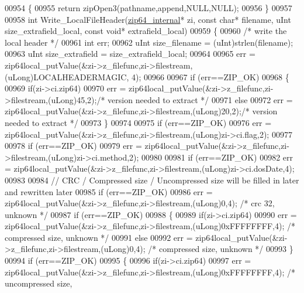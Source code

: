 \begin{DoxyCode}
00954 \{
00955     \textcolor{keywordflow}{return} zipOpen3(pathname,append,NULL,NULL);
00956 \}
00957 
00958 \textcolor{keywordtype}{int} Write\_LocalFileHeader(\hyperlink{structzip64__internal}{zip64\_internal}* zi, \textcolor{keyword}{const} \textcolor{keywordtype}{char}* filename, uInt 
      size\_extrafield\_local, \textcolor{keyword}{const} \textcolor{keywordtype}{void}* extrafield\_local)
00959 \{
00960   \textcolor{comment}{/* write the local header */}
00961   \textcolor{keywordtype}{int} err;
00962   uInt size\_filename = (uInt)strlen(filename);
00963   uInt size\_extrafield = size\_extrafield\_local;
00964 
00965   err = zip64local\_putValue(&zi->z\_filefunc,zi->filestream,(uLong)LOCALHEADERMAGIC, 4);
00966 
00967   \textcolor{keywordflow}{if} (err==ZIP\_OK)
00968   \{
00969     \textcolor{keywordflow}{if}(zi->ci.zip64)
00970       err = zip64local\_putValue(&zi->z\_filefunc,zi->filestream,(uLong)45,2);\textcolor{comment}{/* version needed to extract */}
00971     \textcolor{keywordflow}{else}
00972       err = zip64local\_putValue(&zi->z\_filefunc,zi->filestream,(uLong)20,2);\textcolor{comment}{/* version needed to extract */}
00973   \}
00974 
00975   \textcolor{keywordflow}{if} (err==ZIP\_OK)
00976     err = zip64local\_putValue(&zi->z\_filefunc,zi->filestream,(uLong)zi->ci.flag,2);
00977 
00978   \textcolor{keywordflow}{if} (err==ZIP\_OK)
00979     err = zip64local\_putValue(&zi->z\_filefunc,zi->filestream,(uLong)zi->ci.method,2);
00980 
00981   \textcolor{keywordflow}{if} (err==ZIP\_OK)
00982     err = zip64local\_putValue(&zi->z\_filefunc,zi->filestream,(uLong)zi->ci.dosDate,4);
00983 
00984   \textcolor{comment}{// CRC / Compressed size / Uncompressed size will be filled in later and rewritten later}
00985   \textcolor{keywordflow}{if} (err==ZIP\_OK)
00986     err = zip64local\_putValue(&zi->z\_filefunc,zi->filestream,(uLong)0,4); \textcolor{comment}{/* crc 32, unknown */}
00987   \textcolor{keywordflow}{if} (err==ZIP\_OK)
00988   \{
00989     \textcolor{keywordflow}{if}(zi->ci.zip64)
00990       err = zip64local\_putValue(&zi->z\_filefunc,zi->filestream,(uLong)0xFFFFFFFF,4); \textcolor{comment}{/* compressed size,
       unknown */}
00991     \textcolor{keywordflow}{else}
00992       err = zip64local\_putValue(&zi->z\_filefunc,zi->filestream,(uLong)0,4); \textcolor{comment}{/* compressed size, unknown */}
00993   \}
00994   \textcolor{keywordflow}{if} (err==ZIP\_OK)
00995   \{
00996     \textcolor{keywordflow}{if}(zi->ci.zip64)
00997       err = zip64local\_putValue(&zi->z\_filefunc,zi->filestream,(uLong)0xFFFFFFFF,4); \textcolor{comment}{/* uncompressed size,
}
\end{DoxyCode}
